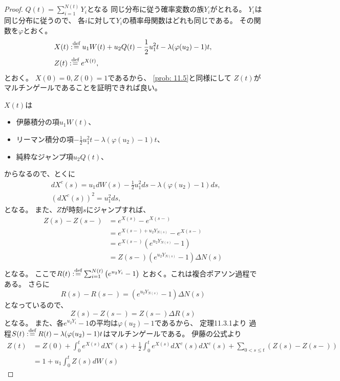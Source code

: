 \documentclass[uplatex]{jsarticle}
\theoremstyle{definition}
\def\dfn{:\overset{\mbox{{\scriptsize def}}}{=}}
\begin{document}
\begin{proof}
  \(Q(t) = \sum_{i=1}^{N(t)}Y_i\)となる
  同じ分布に従う確率変数の族\(Y_i\)がとれる。
  \(Y_i\)は同じ分布に従うので、
  各\(i\)に対して\(Y_i\)の積率母関数はどれも同じである。
  その関数を\(\varphi\)とおく。
  \begin{align*}
    &X(t) \dfn
    u_1W(t) + u_2Q(t) - \frac{1}{2}u_1^2t - \lambda(\varphi(u_2)-1)t, \\
    &Z(t) \dfn e^{X(t)},
  \end{align*}
  とおく。
  \(X(0)=0,Z(0)=1\)であるから、
  \autoref{prob: 11.5}と同様にして
  \(Z(t)\)がマルチンゲールであることを証明できれば良い。

  \(X(t)\)は
  \begin{itemize}
    \item 伊藤積分の項\(u_1W(t)\)、
    \item リーマン積分の項\(-\frac{1}{2}u_1^2t - \lambda(\varphi(u_2)-1)t\)、
    \item 純粋なジャンプ項\(u_2Q(t)\)、
  \end{itemize}
  からなるので、とくに
  \begin{align*}
    &dX^c(s) = u_1dW(s) - \frac{1}{2}u_1^2ds - \lambda(\varphi(u_2)-1)ds, \\
    &(dX^c(s))^2 = u_1^2ds,
  \end{align*}
  となる。
  また、\(Z\)が時刻\(s\)にジャンプすれば、
  \begin{align*}
    Z(s)-Z(s-)
    &= e^{X(s)}-e^{X(s-)} \\
    &= e^{X(s-)+u_2Y_{N(s)}}-e^{X(s-)} \\
    &= e^{X(s-)}\left( e^{u_2Y_{N(s)}}-1 \right) \\
    &= Z(s-)\left( e^{u_2Y_{N(s)}}-1 \right)\Delta N(s) \\
  \end{align*}
  となる。
  ここで\(R(t) \dfn \sum_{i=1}^{N(t)}\left( e^{u_2Y_i}-1 \right)\)
  とおく。これは複合ポアソン過程である。
  さらに
  \[
  R(s)-R(s-) = \left( e^{u_2Y_{N(s)}}-1 \right)\Delta N(s)
  \]
  となっているので、
  \[
  Z(s)-Z(s-) = Z(s-)\Delta R(s)
  \]
  となる。
  また、各\(e^{u_2Y_i}-1\)の平均は\(\varphi(u_2)-1\)であるから、
  定理11.3.1より
  過程\(S(t) \dfn R(t)-\lambda(\varphi(u_2)-1)t\)はマルチンゲールである。
  伊藤の公式より
  \begin{align*}
    Z(t)
    &= Z(0) + \int_0^t e^{X(s)}dX^c(s)
    + \frac{1}{2}\int_0^te^{X(s)}dX^c(s)dX^c(s)
    + \sum_{0<s\leq t}(Z(s)-Z(s-)) \\
    &= 1 + u_1\int_0^t Z(s)dW(s)

\end{align*}
\end{proof}
\end{document}
